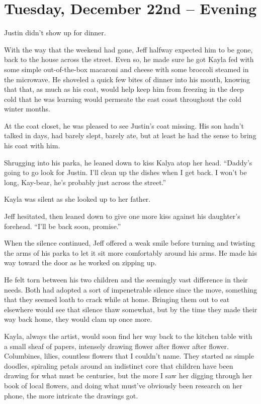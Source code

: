 \chapter{Tuesday, December 22nd -- Evening}

Justin didn't show up for dinner.

With the way that the weekend had gone, Jeff halfway expected him to be gone, back to the house across the street.  Even so, he made sure he got Kayla fed with some simple out-of-the-box macaroni and cheese with some broccoli steamed in the microwave.  He shoveled a quick few bites of dinner into his mouth, knowing that that, as much as his coat, would help keep him from freezing in the deep cold that he was learning would permeate the east coast throughout the cold winter months.

At the coat closet, he was pleased to see Justin's coat missing.  His son hadn't talked in days, had barely slept, barely ate, but at least he had the sense to bring his coat with him.

Shrugging into his parka, he leaned down to kiss Kalya atop her head.  ``Daddy's going to go look for Justin.  I'll clean up the dishes when I get back.  I won't be long, Kay-bear, he's probably just across the street.''

Kayla was silent as she looked up to her father.

Jeff hesitated, then leaned down to give one more kiss against his daughter's forehead.  ``I'll be back soon, promise.''

When the silence continued, Jeff offered a weak smile before turning and twisting the arms of his parka to let it sit more comfortably around his arms.  He made his way toward the door as he worked on zipping up.

\secdiv

He felt torn between his two children and the seemingly vast difference in their needs.  Both had adopted a sort of impenetrable silence since the move, something that they seemed loath to crack while at home.  Bringing them out to eat elsewhere would see that silence thaw somewhat, but by the time they made their way back home, they would clam up once more.

Kayla, always the artist, would soon find her way back to the kitchen table with a small sheaf of papers, intensely drawing flower after flower after flower.  Columbines, lilies, countless flowers that I couldn't name.  They started as simple doodles, spiraling petals around an indistinct core that children have been drawing for what must be centuries, but the more I saw her digging through her book of local flowers, and doing what must've obviously been research on her phone, the more intricate the drawings got.

